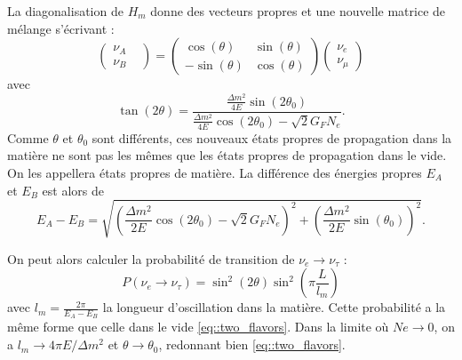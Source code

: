             La diagonalisation de $H_m$ donne des vecteurs propres et une nouvelle matrice de mélange s'écrivant :
            \begin{equation}
                 \left(\begin{matrix}\nu_A & \\ \nu_B\end{matrix}\right) = \left(\begin{matrix}\cos(\theta) & \sin(\theta) \\ -\sin(\theta) & \cos(\theta)\end{matrix}\right)\left(\begin{matrix}\nu_e \\ \nu_{\mu}\end{matrix}\right)
            \end{equation}
            avec 
            \begin{equation}\label{eq::tan2theta}
                \tan(2\theta)=\frac{\frac{\Delta m^2}{4E}\sin(2\theta_0)}{\frac{\Delta m^2}{4E}\cos(2\theta_0)-\sqrt{2}G_F N_e}.
            \end{equation}
            Comme $\theta$ et $\theta_0$ sont différents, ces nouveaux états propres de propagation dans la matière ne sont pas les mêmes que les états propres de propagation dans le vide. On les appellera états propres de matière. La différence des énergies propres $E_A$ et $E_B$ est alors de 
            \begin{equation}
                E_A - E_B = \sqrt{\left(\frac{\Delta m^2}{2E}\cos(2\theta_0)-\sqrt{2}G_F N_e\right)^2 + \left(\frac{\Delta m^2}{2E}\sin(\theta_0)\right)^2}.
            \end{equation}
            
            On peut alors calculer la probabilité de transition de  $\nu_e\to\nu_{\tau}$ : 
            \begin{equation}\label{eq::two_flavors_matter}
                P(\nu_e\to\nu_{\tau}) = \sin^2(2\theta)\sin^2\left(\pi\frac{L}{l_m}\right)
            \end{equation}
            avec $l_m=\frac{2\pi}{E_A-E_B}$ la longueur d'oscillation dans la matière. Cette probabilité a la même forme que celle dans le vide \eqref{eq::two_flavors}. Dans la limite où $Ne\to 0$, on a $l_m\to 4\pi E/\Delta m^2$ et $\theta \to \theta_0$, redonnant bien \eqref{eq::two_flavors}.
            
